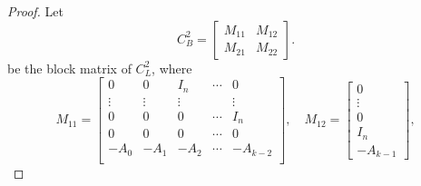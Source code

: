 \documentclass [12pt]{article}
\begin{document}
\begin{proof}
   Let
\[
C^{2}_{B} = \begin{bmatrix} M_{11} & M_{12} \\ M_{21} & M_{22} \end{bmatrix}.
\] be the block  matrix of $C^{2}_{L}$, where \[
M_{11} = 
\begin{bmatrix}
0 & 0 & I_n & \cdots & 0 \\
\vdots & \vdots  & \vdots &  &\vdots\\
0 & 0 & 0 & \cdots & I_n \\
0 & 0 & 0 & \cdots & 0 \\
-A_0 & -A_1 & -A_2 & \cdots & -A_{k-2} \\
\end{bmatrix}, \quad M_{12} = 
\begin{bmatrix}
0 \\
\vdots \\
0\\
I_n\\ -A_{k-1}
\end{bmatrix},
\]


\end{proof}
\end{document}
